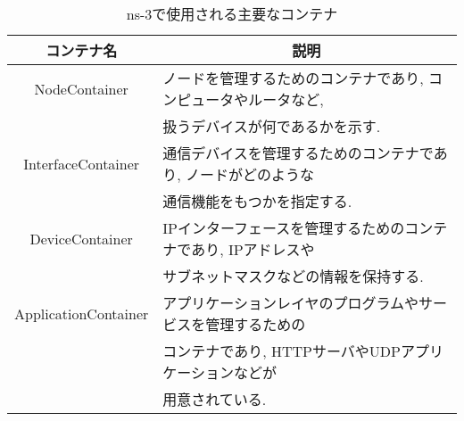 \begin{longtable}{cl}
  \caption{ns-3で使用される主要なコンテナ}
  \label{tab:container} \\
  \endfirsthead
  \hline
  \multicolumn{1}{c}{コンテナ名} & \multicolumn{1}{c}{説明} \\ \hline \hline
  NodeContainer & ノードを管理するためのコンテナであり, 
  コンピュータやルータなど,\\ 
  &扱うデバイスが何であるかを示す. \\
  InterfaceContainer & 通信デバイスを管理するためのコンテナであり, 
  ノードがどのような\\ 
  &通信機能をもつかを指定する.  \\
  DeviceContainer & IPインターフェースを管理するためのコンテナであり, IPアドレスや\\ 
  &サブネットマスクなどの情報を保持する. \\
  ApplicationContainer & アプリケーションレイヤのプログラムやサービスを管理するための\\
  &コンテナであり, HTTPサーバやUDPアプリケーションなどが\\
  &用意されている. \\ \hline
\end{longtable}
